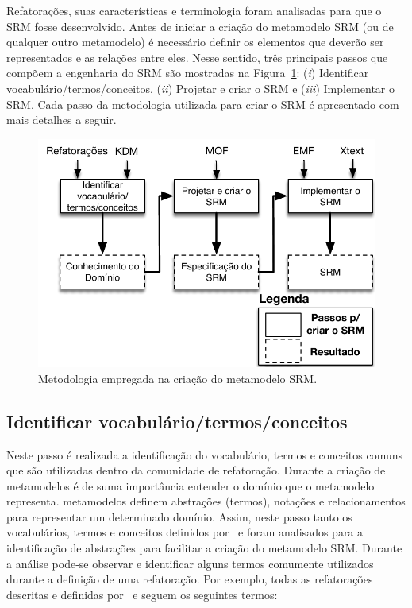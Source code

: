 
Refatorações, suas características e terminologia foram analisadas para que o SRM fosse desenvolvido. Antes de iniciar a criação do metamodelo SRM (ou de qualquer outro metamodelo) é necessário definir os elementos que deverão ser representados e as relações entre eles. Nesse sentido, três principais passos que compõem a engenharia do SRM são mostradas na Figura~\ref{fig:etapas_da_fase_de_e_do_SRM}: (\textit{i})  Identificar vocabulário/termos/conceitos, (\textit{ii}) Projetar e criar o SRM e (\textit{iii}) Implementar o SRM. Cada passo da metodologia utilizada para criar o SRM é apresentado com mais detalhes a seguir.

\begin{figure}[h]
	\centering
	\caption{Metodologia empregada na criação do metamodelo SRM.}
	\label{fig:etapas_da_fase_de_e_do_SRM}
	\includegraphics[scale=0.65]{images/metodologiaParaCriarOSRM}
	\fautor
\end{figure}



\subsection{Identificar vocabulário/termos/conceitos}

Neste passo é realizada a identificação do vocabulário, termos e conceitos comuns que são utilizadas dentro da comunidade de refatoração. Durante a criação de metamodelos é de suma importância entender o domínio que o metamodelo representa. metamodelos definem abstrações (termos), notações e relacionamentos para representar um determinado domínio. Assim, neste passo tanto os vocabulários, termos e conceitos definidos por~ e  foram analisados para a identificação de abstrações para facilitar a criação do metamodelo SRM. Durante a análise pode-se observar e identificar alguns termos comumente utilizados durante a definição de uma refatoração. Por exemplo, todas as refatorações descritas e definidas por~ e  seguem os seguintes termos: 

